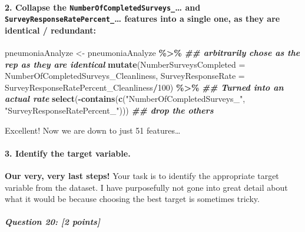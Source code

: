 \documentclass[
]{article}
\newenvironment{Shaded}{\begin{snugshade}}{\end{snugshade}}
\newcommand{\AttributeTok}[1]{\textcolor[rgb]{0.13,0.29,0.53}{#1}}
\newcommand{\DecValTok}[1]{\textcolor[rgb]{0.00,0.00,0.81}{#1}}
\newcommand{\DocumentationTok}[1]{\textcolor[rgb]{0.56,0.35,0.01}{\textbf{\textit{#1}}}}
\newcommand{\FunctionTok}[1]{\textcolor[rgb]{0.13,0.29,0.53}{\textbf{#1}}}
\newcommand{\NormalTok}[1]{#1}
\newcommand{\OtherTok}[1]{\textcolor[rgb]{0.56,0.35,0.01}{#1}}
\newcommand{\SpecialCharTok}[1]{\textcolor[rgb]{0.81,0.36,0.00}{\textbf{#1}}}
\newcommand{\StringTok}[1]{\textcolor[rgb]{0.31,0.60,0.02}{#1}}
\begin{document}
\paragraph{\texorpdfstring{2. Collapse the
\texttt{NumberOfCompletedSurveys\_}\ldots{} and
\texttt{SurveyResponseRatePercent\_}\ldots{} features into a single one,
as they are identical /
redundant:}{2. Collapse the NumberOfCompletedSurveys\_\ldots{} and SurveyResponseRatePercent\_\ldots{} features into a single one, as they are identical / redundant:}}\label{collapse-the-numberofcompletedsurveys_-and-surveyresponseratepercent_-features-into-a-single-one-as-they-are-identical-redundant}

\begin{Shaded}
\begin{Highlighting}[]
\NormalTok{pneumoniaAnalyze }\OtherTok{\textless{}{-}}\NormalTok{ pneumoniaAnalyze }\SpecialCharTok{\%\textgreater{}\%} 
  \DocumentationTok{\#\# arbitrarily chose as the rep as they are identical}
  \FunctionTok{mutate}\NormalTok{(}\AttributeTok{NumberSurveysCompleted =}\NormalTok{ NumberOfCompletedSurveys\_Cleanliness,              }
         \AttributeTok{SurveyResponseRate =}\NormalTok{ SurveyResponseRatePercent\_Cleanliness}\SpecialCharTok{/}\DecValTok{100}\NormalTok{) }\SpecialCharTok{\%\textgreater{}\%}       \DocumentationTok{\#\# Turned into an actual rate }
  \FunctionTok{select}\NormalTok{(}\SpecialCharTok{{-}}\FunctionTok{contains}\NormalTok{(}\FunctionTok{c}\NormalTok{(}\StringTok{"NumberOfCompletedSurveys\_"}\NormalTok{, }\StringTok{"SurveyResponseRatePercent\_"}\NormalTok{)))   }\DocumentationTok{\#\# drop the others}
\end{Highlighting}
\end{Shaded}

Excellent! Now we are down to just 51 features\ldots{}

\paragraph{3. Identify the target
variable.}\label{identify-the-target-variable.}

\textbf{Our very, very last steps!} Your task is to identify the
appropriate target variable from the dataset. I have purposefully not
gone into great detail about what it would be because choosing the best
target is sometimes tricky.

\subparagraph{\texorpdfstring{\textbf{Question 20}: {[}2
points{]}}{Question 20: {[}2 points{]}}}\label{question-20-2-points}
\end{document}
